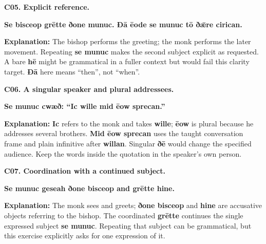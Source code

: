 \par\begin{minipage}{\linewidth}\raggedright
\textbf{C05. Explicit reference.}

\textbf{Se bisceop grētte ðone munuc. Ðā ēode se munuc tō ðǣre cirican.}

\textbf{Explanation:} The bishop performs the greeting; the monk performs the later movement. Repeating \textbf{se munuc} makes the second subject explicit as requested. A bare \textbf{hē} might be grammatical in a fuller context but would fail this clarity target. \textbf{Ðā} here means “then”, not “when”.

\end{minipage}\par\addvspace{4pt}

\par\begin{minipage}{\linewidth}\raggedright
\textbf{C06. A singular speaker and plural addressees.}

\textbf{Se munuc cwæð: “Ic wille mid ēow sprecan.”}

\textbf{Explanation:} \textbf{Ic} refers to the monk and takes \textbf{wille}; \textbf{ēow} is plural because he addresses several brothers. \textbf{Mid ēow sprecan} uses the taught conversation frame and plain infinitive after \textbf{willan}. Singular \textbf{ðē} would change the specified audience. Keep the words inside the quotation in the speaker’s own person.

\end{minipage}\par\addvspace{4pt}

\par\begin{minipage}{\linewidth}\raggedright
\textbf{C07. Coordination with a continued subject.}

\textbf{Se munuc geseah ðone bisceop and grētte hine.}

\textbf{Explanation:} The monk sees and greets; \textbf{ðone bisceop} and \textbf{hine} are accusative objects referring to the bishop. The coordinated \textbf{grētte} continues the single expressed subject \textbf{se munuc}. Repeating that subject can be grammatical, but this exercise explicitly asks for one expression of it.

\end{minipage}\par\addvspace{4pt}

